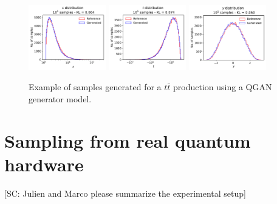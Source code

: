 \documentclass[twocolumn,preprintnumbers,superscriptaddress]{revtex4-2}
\begin{document}
\begin{figure}


  \includegraphics[width=0.3\textwidth]{plots/LHCttbar/s-distribution_LHCdata_100k.pdf}%
  \includegraphics[width=0.3\textwidth]{plots/LHCttbar/t-distribution_LHCdata_100k.pdf}%
  \includegraphics[width=0.3\textwidth]{plots/LHCttbar/y-distribution_LHCdata_100k.pdf}

  \caption{\label{fig:3dgauss}Example of samples generated for a $t\bar{t}$
    production using a QGAN generator model.}
\end{figure}

\section{Sampling from real quantum hardware}
\label{sec:deployment}

{\color{red}[SC: Julien and Marco please summarize the experimental setup]}
\end{document}
